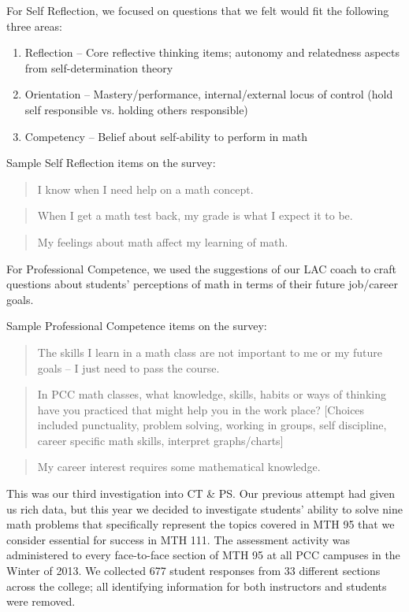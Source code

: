 \begin{description}
For Self Reflection, we focused on questions that we felt would fit the
following three areas:
\begin{enumerate}
\item Reflection -- Core reflective thinking items; autonomy and relatedness
  aspects from self-determination theory
\item Orientation -- Mastery/performance, internal/external locus of control
  (hold self responsible vs. holding others responsible)
\item Competency -- Belief about self-ability to perform in math
\end{enumerate}
Sample Self Reflection items on the survey:
\begin{quote}
\item I know when I need help on a math concept.
\end{quote}
\begin{quote}
\item When I get a math test back, my grade is what I expect it to be.
\end{quote}
\begin{quote}
\item My feelings about math affect my learning of math.
\end{quote}

For Professional Competence, we used the suggestions of our LAC coach to craft
questions about students' perceptions of math in terms of their future
job/career goals. 

Sample Professional Competence items on the survey:
\begin{quote}
The skills I learn in a math class are not important to me or my future goals --
I just need to pass the course.
\end{quote}
\begin{quote}
In PCC math classes, what knowledge, skills, habits or ways of thinking have you
practiced that might help you in the work place? [Choices included punctuality,
problem solving, working in groups, self discipline, career specific math
skills, interpret graphs/charts]
\end{quote}
\begin{quote}
My career interest requires some mathematical knowledge.
\end{quote}

\item[2012/13:  Critical Thinking \& Problem-Solving and Professional Competence]

This was our third investigation into CT \& PS.  Our previous attempt had given
us rich data, but this year we decided to investigate students' ability to solve
nine math problems that specifically represent the topics covered in MTH 95 that
we consider essential for success in MTH 111.  The assessment activity was
administered to every face-to-face section of MTH 95 at all PCC campuses in the
Winter of 2013.  We collected 677 student responses from 33 different sections
across the college; all identifying information for both instructors and
students were removed.


\end{description}

